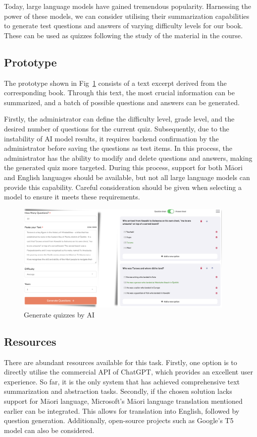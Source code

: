 Today, large language models have gained tremendous popularity. 
Harnessing the power of these models, we can consider utilising their summarization capabilities to generate test questions and answers of varying difficulty levels for our book. 
These can be used as quizzes following the study of the material in the course.

\subsection{Prototype}

The prototype shown in Fig~\ref{s-3} consists of a text excerpt derived from the corresponding book. 
Through this text, the most crucial information can be summarized, and a batch of possible questions and answers can be generated. 

Firstly, the administrator can define the difficulty level, grade level, and the desired number of questions for the current quiz. 
Subsequently, due to the instability of AI model results, it requires backend confirmation by the administrator before saving the questions as test items. 
In this process, the administrator has the ability to modify and delete questions and answers, making the generated quiz more targeted. 
During this process, support for both Māori and English languages should be available, but not all large language models can provide this capability. 
Careful consideration should be given when selecting a model to ensure it meets these requirements.

\begin{figure}[htbp]
  \centerline{\includegraphics[width=300pt]{images/s-3.png}}
  \caption{Generate quizzes by AI}
  \label{s-3}
\end{figure}

\subsection{Resources}

There are abundant resources available for this task. 
Firstly, one option is to directly utilise the commercial API of ChatGPT, which provides an excellent user experience. 
So far, it is the only system that has achieved comprehensive text summarization and abstraction tasks. 
Secondly, if the chosen solution lacks support for Māori language, Microsoft's Māori language translation mentioned earlier can be integrated. 
This allows for translation into English, followed by question generation. 
Additionally, open-source projects such as Google's T5 model \autocite{roberts2022t5x} can also be considered.

